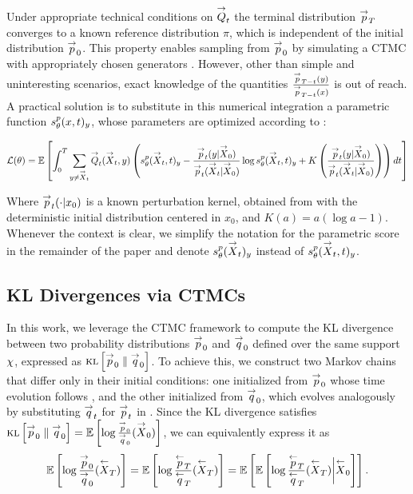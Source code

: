 Under appropriate technical conditions on $\overset{\rightarrow}{Q}_t$ \citep{lou2024discrete} the terminal distribution $\overset{\rightarrow}{p}_T$ converges to a known reference distribution $\pi$, which is independent of the initial distribution $\overset{\rightarrow}{p}_0$. This property enables sampling from $\overset{\rightarrow}{p}_0$ by simulating a \gls{CTMC} with appropriately chosen generators \citep{sun2023scorebasedcontinuoustimediscretediffusion, kelly1981reversibility}. However, other than simple and uninteresting scenarios, exact knowledge of the quantities $\frac{\overset{\rightarrow}{p}_{T-t}(y)}{\overset{\rightarrow}{p}_{T-t}(x)}$ is out of reach. A practical solution is to substitute in this numerical integration a parametric function $s^p_\theta(x,t)_y$, whose parameters are optimized according to \citet{lou2024discrete}:

{\small\begin{equation}\label{eq:lossfn}
    \mathcal{L}(\theta) = \mathbb{E}\left[\int_0^T\sum_{y\neq \overset{\rightarrow}{X}_t}\overset{\rightarrow}{Q}_t(\overset{\rightarrow}{X}_t,y)\left(s^p_\theta(\overset{\rightarrow}{X}_t,t)_y-\frac{\overset{\rightarrow}{p}_t(y|\overset{\rightarrow}{X}_0)}{\overset{\rightarrow}{p}_t(\overset{\rightarrow}{X}_t|\overset{\rightarrow}{X}_0)}\log s^p_\theta(\overset{\rightarrow}{X}_t,t)_y+K\left(\frac{\overset{\rightarrow}{p}_t(y|\overset{\rightarrow}{X}_0)}{\overset{\rightarrow}{p}_t(\overset{\rightarrow}{X}_t|\overset{\rightarrow}{X}_0)}\right)\right)dt\right]
\end{equation}}

Where $\overset{\rightarrow}{p}_t(\cdot|x_0)$ is a known perturbation kernel, obtained from  with the deterministic initial distribution centered in $x_0$, and $K(a)=a(\log a-1)$. Whenever the context is clear, we simplify the notation for the parametric score in the remainder of the paper and denote 
$s^p_\theta(\overset{\rightarrow}{X}_t)_y$ instead of $s^p_\theta(\overset{\rightarrow}{X}_t,t)_y$.
 

\subsection{\gls{KL} Divergences via \glspl{CTMC}}\label{subsec:klfor}

In this work, we leverage the \gls{CTMC} framework to compute the KL divergence between two probability distributions $\overset{\rightarrow}{p}_0$ and $\overset{\rightarrow}{q}_0$ defined over the same support $\chi$, expressed as $\textsc{kl}\left[\overset{\rightarrow}{p}_0\;\|\;\overset{\rightarrow}{q}_0\right]$. To achieve this, we construct two Markov chains that differ only in their initial conditions: one initialized from $\overset{\rightarrow}{p}_0$ whose time evolution follows , and the other initialized from $\overset{\rightarrow}{q}_0$, which evolves analogously by substituting $\overset{\rightarrow}{q}_t$ for $\overset{\rightarrow}{p}_t$ in . Since the KL divergence satisfies $\textsc{kl}\left[\overset{\rightarrow}{p}_0\;\|\;\overset{\rightarrow}{q}_0\right]=\mathbb{E}\left[\log\frac{\overset{\rightarrow}{p}_0}{\overset{\rightarrow}{q}_0}(\overset{\rightarrow}{X}_0)\right]$, we can equivalently express it as
\begin{equation}\label{eq:kl_expressions}
    \mathbb{E}\left[\log\frac{\overset{\rightarrow}{p}_0}{\overset{\rightarrow}{q}_0}(\overset{\leftarrow}{X}_T)\right] =\mathbb{E}\left[\log\frac{\overset{\leftarrow}{p}_T}{\overset{\leftarrow}{q}_T}(\overset{\leftarrow}{X}_T)\right] = \mathbb{E} \left[\mathbb{E}\left[\log\frac{\overset{\leftarrow}{p}_T}{\overset{\leftarrow}{q}_T}(\overset{\leftarrow}{X}_T)\bigg|\overset{\leftarrow}{X}_0\right]\right].
\end{equation}

